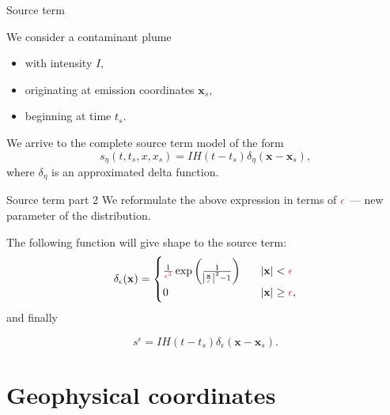 \documentclass{beamer}
\begin{document}
\begin{frame}{Source term}

We consider a contaminant plume
\begin{itemize}
\item with intensity $I,$
\item originating at emission coordinates $\mathbf{x}_s,$
\item beginning at time $t_s.$
\end{itemize}

We arrive to the complete source term model of the form
%
$$s_\eta (t, t_s, x, x_s) = I H(t-t_s) \delta_\eta (\mathbf{x} - \mathbf{x}_s), $$
%
where $\delta_\eta$ is an approximated delta function.

\end{frame}

\begin{frame}{Source term part 2}
We reformulate the above expression in terms of $\textcolor{jasper}{\epsilon}$ --- new parameter of the distribution.

The following function will give shape to the source term:
%
$$
\delta_\epsilon (\mathbf{x}) = 
  \begin{cases}
       \frac{1}{\textcolor{jasper}{\epsilon^3}} \exp{\bigg ( \frac{1}{\abs{{\frac{\mathbf{x}}{\textcolor{jasper}{\epsilon}}}}^2-1} \bigg ) } &\quad \abs{\mathbf{x}} < \textcolor{jasper}{\epsilon} \\
       0 &\quad \abs{\mathbf{x}} \geq \textcolor{jasper}{\epsilon}, \\
  \end{cases}
$$
%
and finally

$$s^\epsilon = I H(t-t_s) \delta_\epsilon (\mathbf{x} - \mathbf{x}_s).$$
\end{frame}

\section{Geophysical coordinates}
\end{document}
